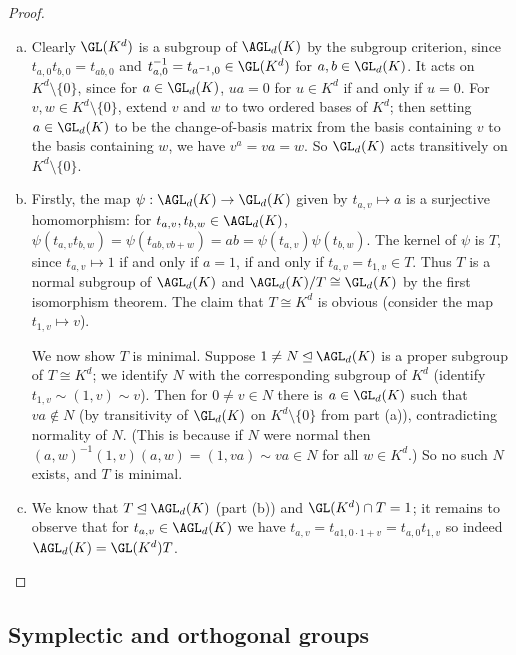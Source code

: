 \begin{proof}
    \begin{enumerate}[(a)]
        \item Clearly $\GL(K^d)$ is a subgroup of $\AGL_d(K)$ by the subgroup criterion, since $t_{a,0}t_{b,0} = t_{ab,0}$ and $t_{a,0}^{-1} = t_{a^{-1},0} \in \GL(K^d)$ for $a,b \in \GL_d(K)$. It acts on $K^d \setminus \{0\}$, since for $a \in \GL_d(K)$, $ua = 0$ for $u \in K^d$ if and only if $u = 0$. For $v,w \in K^d \setminus \{0\}$, extend $v$ and $w$ to two ordered bases of $K^d$; then setting $a \in \GL_d(K)$ to be the change-of-basis matrix from the basis containing $v$ to the basis containing $w$, we have $v^a = va = w$. So $\GL_d(K)$ acts transitively on $K^d \setminus \{0\}$.
        \item Firstly, the map $\psi : \AGL_d(K) \to \GL_d(K)$ given by $t_{a,v} \mapsto a$ is a surjective homomorphism: for $t_{a,v},t_{b,w} \in \AGL_d(K)$, $\psi(t_{a,v}t_{b,w}) = \psi(t_{ab,vb+w}) = ab = \psi(t_{a,v})\psi(t_{b,w})$. The kernel of $\psi$ is $T$, since $t_{a,v} \mapsto 1$ if and only if $a = 1$, if and only if $t_{a,v} = t_{1,v} \in T$. Thus $T$ is a normal subgroup of $\AGL_d(K)$ and $\AGL_d(K)/T \cong \GL_d(K)$ by the first isomorphism theorem. The claim that $T \cong K^d$ is obvious (consider the map $t_{1,v} \mapsto v$).

              We now show $T$ is minimal. Suppose $1 \neq N \unlhd \AGL_d(K)$ is a proper subgroup of $T \cong K^d$; we identify $N$ with the corresponding subgroup of $K^d$ (identify $t_{1,v} \sim (1,v) \sim v$). Then for $0 \neq v \in N$ there is $a \in \GL_d(K)$ such that $va \not\in N$ (by transitivity of $\GL_d(K)$ on $K^d \setminus \{0\}$ from part (a)), contradicting normality of $N$. (This is because if $N$ were normal then $(a,w)^{-1}(1,v)(a,w) = (1,va) \sim va \in N$ for all $w \in K^d$.) So no such $N$ exists, and $T$ is minimal.
        \item We know that $T \unlhd \AGL_d(K)$ (part (b)) and $\GL(K^d) \cap T = 1$; it remains to observe that for $t_{a,v} \in \AGL_d(K)$ we have $t_{a,v} = t_{a1,0 \cdot 1+v} = t_{a,0}t_{1,v}$ so indeed $\AGL_d(K) = \GL(K^d)T$.
    \end{enumerate}
\end{proof}

\subsection{Symplectic and orthogonal groups}


